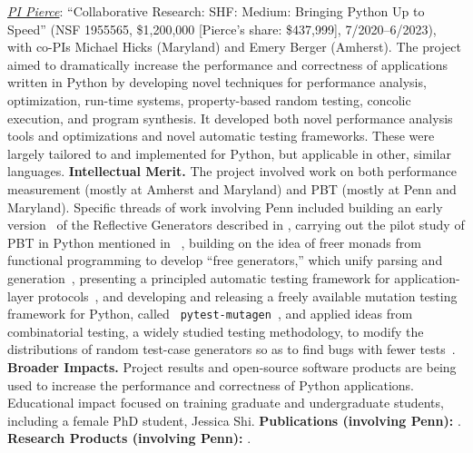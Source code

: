
\emph{\underline{PI Pierce}}: ``Collaborative Research:
SHF: Medium: Bringing Python Up to Speed'' (NSF 1955565, \$1,200,000
[Pierce's share: \$437,999],
7/2020--6/2023), with co-PIs Michael Hicks (Maryland) and Emery Berger
(Amherst).
The project aimed to dramatically increase the performance and
correctness of applications written in Python by developing novel
techniques for performance analysis, optimization, run-time systems,
property-based random testing, concolic execution, and program
synthesis. It developed both
novel performance analysis tools and optimizations and novel automatic
testing frameworks. These were largely tailored to and implemented for
Python, but applicable in other, similar languages.
%
{\bf Intellectual Merit.} The project involved work on both
performance measurement (mostly at Amherst and Maryland) and PBT (mostly at Penn
and Maryland).  Specific threads of work involving Penn included
building an early
version~\cite{Frohlich2023} of the Reflective Generators described in
, carrying out the pilot study of PBT in Python
mentioned in
~\cite{goldstein_problems_2022},
building on the idea of
freer monads from functional programming to develop ``free
generators,'' which unify parsing and
generation~\cite{goldstein2022parsing},
presenting a principled
automatic testing framework for application-layer
protocols~\cite{Li2021:MBToNA}, and developing and releasing a freely
available mutation testing framework for Python, called {\tt
  pytest-mutagen}~\cite{pytestmutagen}, and applied ideas from
combinatorial testing, a widely studied testing methodology, to modify
the distributions of random test-case generators so as to find bugs
with fewer tests~\cite{DBLP:conf/esop/GoldsteinHLP21}.
%
{\bf Broader Impacts.} Project results and open-source software
products are being used to increase the
performance and correctness of Python applications.
Educational impact focused on training graduate and
undergraduate students, including a female PhD student, Jessica
Shi.
%
{\bf Publications (involving Penn):} \cite{Frohlich2023,DBLP:conf/esop/GoldsteinHLP21,
  goldstein2022parsing, goldstein_problems_2022, Li2021:MBToNA}.
{\bf Research Products (involving Penn):} \cite{pytestmutagen}.

